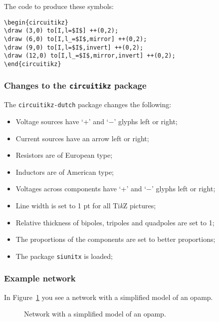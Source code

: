 \documentclass[12pt]{article}
\begin{document}
The code to produce these symbols:

\begin{lstlisting}
\begin{circuitikz}
\draw (3,0) to[I,l=$I$] ++(0,2);
\draw (6,0) to[I,l_=$I$,mirror] ++(0,2);
\draw (9,0) to[I,l=$I$,invert] ++(0,2);
\draw (12,0) to[I,l_=$I$,mirror,invert] ++(0,2);
\end{circuitikz}
\end{lstlisting}

\subsubsection*{Changes to the \texttt{circuitikz} package}
The \texttt{circuitikz-dutch} package changes the following:

\begin{itemize}
\item Voltage sources have `+' and `$-$' glyphs left or right;
\item Current sources have an arrow left or right;
\item Resistors are of European type;
\item Inductors are of American type;
\item Voltages across components have `+' and `$-$' glyphs left or right;
\item Line width is set to 1 pt for all Ti\emph{k}Z pictures;
\item Relative thickness of bipoles, tripoles and quadpoles are set to 1;
\item The proportions of the components are set to better proportions;
\item The package \texttt{siunitx} is loaded;
\end{itemize}


\subsubsection*{Example network}

In Figure~\ref{fig:gelmodelopampinverter} you see a network with a simplified model of an opamp.

\begin{figure}[H]
\centering
{}
\caption{Network with a simplified model of an opamp.}
\label{fig:gelmodelopampinverter}
\end{figure}
\end{document}
